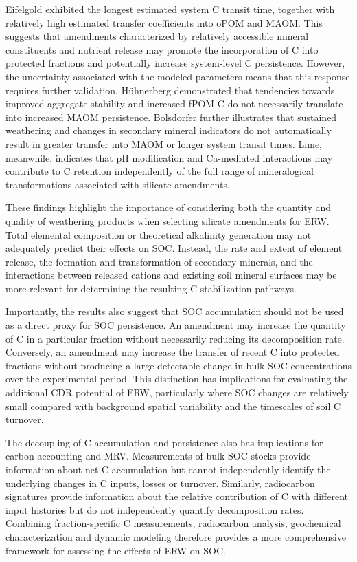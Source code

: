 \documentclass[preprint,12pt]{elsarticle}
\begin{document}
Eifelgold exhibited the longest estimated system C transit time, together with relatively high estimated transfer coefficients into oPOM and MAOM. This suggests that amendments characterized by relatively accessible mineral constituents and nutrient release may promote the incorporation of C into protected fractions and potentially increase system-level C persistence. However, the uncertainty associated with the modeled parameters means that this response requires further validation. Hühnerberg demonstrated that tendencies towards improved aggregate stability and increased fPOM-C do not necessarily translate into increased MAOM persistence. Bolsdorfer further illustrates that sustained weathering and changes in secondary mineral indicators do not automatically result in greater transfer into MAOM or longer system transit times. Lime, meanwhile, indicates that pH modification and Ca-mediated interactions may contribute to C retention independently of the full range of mineralogical transformations associated with silicate amendments.

These findings highlight the importance of considering both the quantity and quality of weathering products when selecting silicate amendments for ERW. Total elemental composition or theoretical alkalinity generation may not adequately predict their effects on SOC. Instead, the rate and extent of element release, the formation and transformation of secondary minerals, and the interactions between released cations and existing soil mineral surfaces may be more relevant for determining the resulting C stabilization pathways.

Importantly, the results also suggest that SOC accumulation should not be used as a direct proxy for SOC persistence. An amendment may increase the quantity of C in a particular fraction without necessarily reducing its decomposition rate. Conversely, an amendment may increase the transfer of recent C into protected fractions without producing a large detectable change in bulk SOC concentrations over the experimental period. This distinction has implications for evaluating the additional CDR potential of ERW, particularly where SOC changes are relatively small compared with background spatial variability and the timescales of soil C turnover.

The decoupling of C accumulation and persistence also has implications for carbon accounting and MRV. Measurements of bulk SOC stocks provide information about net C accumulation but cannot independently identify the underlying changes in C inputs, losses or turnover. Similarly, radiocarbon signatures provide information about the relative contribution of C with different input histories but do not independently quantify decomposition rates. Combining fraction-specific C measurements, radiocarbon analysis, geochemical characterization and dynamic modeling therefore provides a more comprehensive framework for assessing the effects of ERW on SOC.
\end{document}

